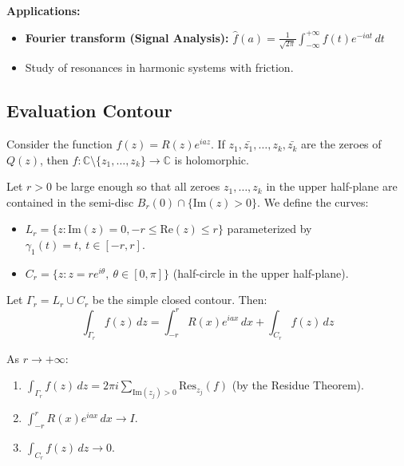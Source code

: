\textbf{Applications:}
\begin{itemize}
    \item \textbf{Fourier transform (Signal Analysis):} $\hat{f}(a) = \frac{1}{\sqrt{2\pi}} \int_{-\infty}^{+\infty} f(t) e^{-iat} \, dt$
    \item Study of resonances in harmonic systems with friction.
\end{itemize}

\subsection{Evaluation Contour}
Consider the function $f(z) = R(z)e^{iaz}$. If $z_1, \bar{z_1}, \dots, z_k, \bar{z_k}$ are the zeroes of $Q(z)$, then $f : \mathbb{C} \setminus \{z_1, \dots, z_k\} \to \mathbb{C}$ is holomorphic.

Let $r > 0$ be large enough so that all zeroes $z_1, \dots, z_k$ in the upper half-plane are contained in the semi-disc $B_r(0) \cap \{\text{Im}(z) > 0\}$. We define the curves:
\begin{itemize}
    \item $L_r = \{z : \text{Im}(z) = 0, -r \le \text{Re}(z) \le r\}$ parameterized by $\gamma_1(t) = t, \ t \in [-r, r]$.
    \item $C_r = \{z : z = r e^{i\theta}, \ \theta \in [0, \pi]\}$ (half-circle in the upper half-plane).
\end{itemize}
Let $\Gamma_r = L_r \cup C_r$ be the simple closed contour. Then:
\begin{equation}
\int_{\Gamma_r} f(z) \, dz = \int_{-r}^{r} R(x)e^{iax} \, dx + \int_{C_r} f(z) \, dz
\end{equation}

As $r \to +\infty$:
\begin{enumerate}
    \item $\int_{\Gamma_r} f(z) \, dz = 2\pi i \sum_{\text{Im}(z_j)>0} \text{Res}_{z_j}(f)$ (by the Residue Theorem).
    \item $\int_{-r}^{r} R(x)e^{iax} \, dx \to I$.
    \item $\int_{C_r} f(z) \, dz \to 0$.
\end{enumerate}

